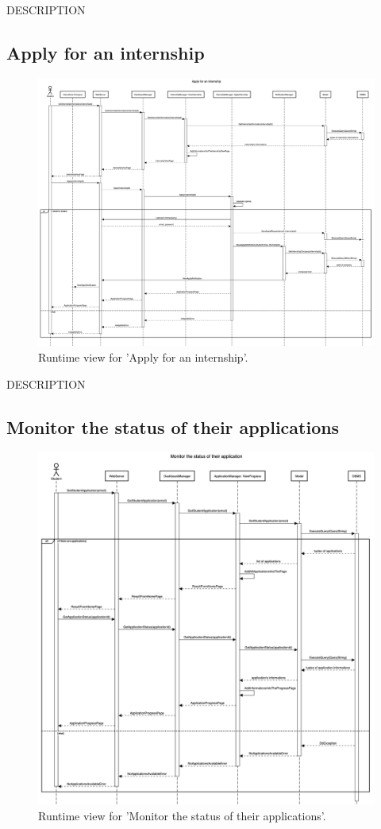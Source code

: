 DESCRIPTION


\subsection{Apply for an internship}
\begin{figure}[H]
    \begin{center}
        \includegraphics[width=0.8\linewidth]{DD/LaTeX/Images/RuntimeView/ApplyInternship.png}
        \caption{Runtime view for 'Apply for an internship'.}
        \label{fig:runtime_ApplyInternship}%
    \end{center}
\end{figure}
DESCRIPTION


\subsection{Monitor the status of their applications}
\begin{figure}[H]
    \begin{center}
        \includegraphics[width=0.8\linewidth]{DD/LaTeX/Images/RuntimeView/MonitorStatusApplication.png}
        \caption{Runtime view for 'Monitor the status of their applications'.}
        \label{fig:runtime_MonitorStatusApplication}%
    \end{center}
\end{figure}

